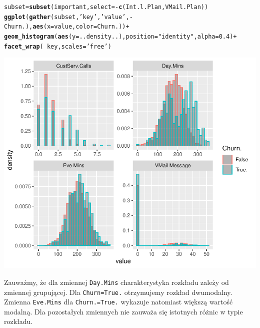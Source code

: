\documentclass{article}\usepackage[]{graphicx}\usepackage[]{color}
\makeatletter
\def\maxwidth{ %
  \ifdim\Gin@nat@width>\linewidth
    \linewidth
  \else
    \Gin@nat@width
  \fi
}
\newcommand{\hlnum}[1]{\textcolor[rgb]{0.686,0.059,0.569}{#1}}%
\newcommand{\hlstr}[1]{\textcolor[rgb]{0.192,0.494,0.8}{#1}}%
\newcommand{\hlopt}[1]{\textcolor[rgb]{0,0,0}{#1}}%
\newcommand{\hlstd}[1]{\textcolor[rgb]{0.345,0.345,0.345}{#1}}%
\newcommand{\hlkwb}[1]{\textcolor[rgb]{0.69,0.353,0.396}{#1}}%
\newcommand{\hlkwc}[1]{\textcolor[rgb]{0.333,0.667,0.333}{#1}}%
\newcommand{\hlkwd}[1]{\textcolor[rgb]{0.737,0.353,0.396}{\textbf{#1}}}%
\newenvironment{kframe}{%
 \def\at@end@of@kframe{}%
 \ifinner\ifhmode%
  \def\at@end@of@kframe{\end{minipage}}%
  \begin{minipage}{\columnwidth}%
 \fi\fi%
 \def\FrameCommand##1{\hskip\@totalleftmargin \hskip-\fboxsep
 \colorbox{shadecolor}{##1}\hskip-\fboxsep
     \hskip-\linewidth \hskip-\@totalleftmargin \hskip\columnwidth}%
 \MakeFramed {\advance\hsize-\width
   \@totalleftmargin\z@ \linewidth\hsize
   \@setminipage}}%
 {\par\unskip\endMakeFramed%
 \at@end@of@kframe}
\newenvironment{knitrout}{}{} %
\makeatother
\begin{document}
\begin{knitrout}
\color{fgcolor}\begin{kframe}
\begin{alltt}
\hlstd{subset} \hlkwb{=} \hlkwd{subset}\hlstd{(important,} \hlkwc{select}\hlstd{=}\hlopt{-}\hlkwd{c}\hlstd{(Int.l.Plan, VMail.Plan))}
\hlkwd{ggplot}\hlstd{(}\hlkwd{gather}\hlstd{(subset,} \hlstr{'key'}\hlstd{,} \hlstr{'value'}\hlstd{,} \hlopt{-}\hlstd{Churn.),} \hlkwd{aes}\hlstd{(}\hlkwc{x}\hlstd{=value,} \hlkwc{color}\hlstd{=Churn.))} \hlopt{+}
  \hlkwd{geom_histogram}\hlstd{(}\hlkwd{aes}\hlstd{(}\hlkwc{y}\hlstd{=..density..),} \hlkwc{position}\hlstd{=}\hlstr{"identity"}\hlstd{,} \hlkwc{alpha}\hlstd{=}\hlnum{0.4}\hlstd{)} \hlopt{+}
  \hlkwd{facet_wrap}\hlstd{(}\hlopt{~}\hlstd{key,} \hlkwc{scales}\hlstd{=}\hlstr{'free'}\hlstd{)}
\end{alltt}
\end{kframe}

{\centering \includegraphics[width=\maxwidth]{figure/Histogramy_z_podzialem_na_grupy-1} 

}



\end{knitrout}

Zauważmy, że dla zmiennej \verb|Day.Mins| charakterystyka rozkładu zależy od zmiennej grupującej. Dla \verb|Churn=True.| otrzymujemy rozkład dwumodalny. Zmienna \verb|Eve.Mins| dla \verb|Churn.=True.| wykazuje natomiast większą wartość modalną. Dla pozostałych zmiennych nie zauważa się istotnych różnic w typie rozkładu. 
\end{document}
